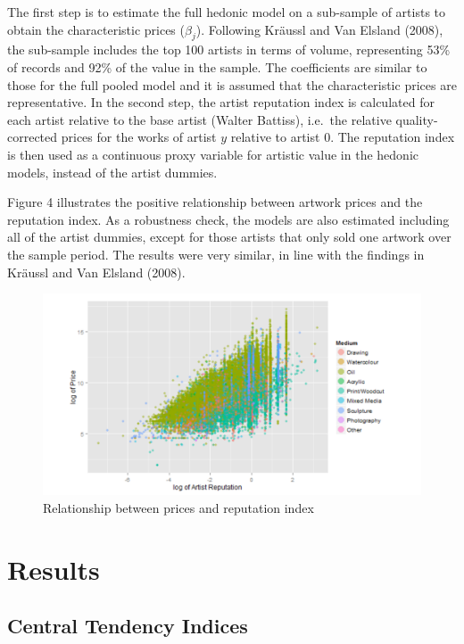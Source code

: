 \documentclass[12pt,]{article}
\begin{document}
The first step is to estimate the full hedonic model on a sub-sample of
artists to obtain the characteristic prices (\(\beta_j\)). Following
Kräussl and Van Elsland (2008), the sub-sample includes the top 100
artists in terms of volume, representing 53\% of records and 92\% of the
value in the sample. The coefficients are similar to those for the full
pooled model and it is assumed that the characteristic prices are
representative. In the second step, the artist reputation index is
calculated for each artist relative to the base artist (Walter Battiss),
i.e.~the relative quality-corrected prices for the works of artist \(y\)
relative to artist \(0\). The reputation index is then used as a
continuous proxy variable for artistic value in the hedonic models,
instead of the artist dummies.

Figure 4 illustrates the positive relationship between artwork prices
and the reputation index. As a robustness check, the models are also
estimated including all of the artist dummies, except for those artists
that only sold one artwork over the sample period. The results were very
similar, in line with the findings in Kräussl and Van Elsland (2008).

\begin{figure}[htbp]
\centering
\includegraphics{Art_Price_Indices_3_files/figure-latex/figure4-1.pdf}
\caption{Relationship between prices and reputation index}
\end{figure}

\section{Results}\label{results}

\subsection{Central Tendency Indices}\label{central-tendency-indices}
\end{document}
